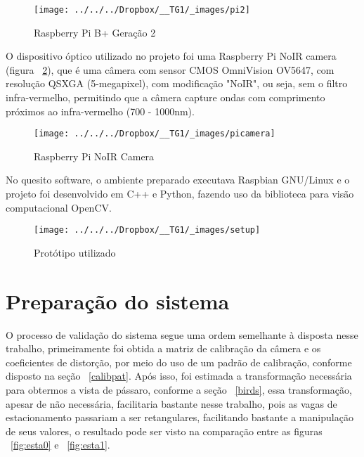 \documentclass[ecp,tc]{iiufrgs}
\begin{document}
\begin{figure}
	\centering
	\caption{Raspberry Pi B+ Geração 2}
	\texttt{[image: ../../../Dropbox/\_\_TG1/\_images/pi2]}
	\label{fig:rpi}
\end{figure}


O dispositivo óptico utilizado no projeto foi uma Raspberry Pi NoIR camera (figura ~\ref{fig:picam}), que é uma câmera com sensor CMOS OmniVision OV5647, com resolução QSXGA (5-megapixel), com modificação "NoIR", ou seja, sem o filtro infra-vermelho, permitindo que a câmera capture ondas com comprimento próximos ao infra-vermelho (700 - 1000nm).

\begin{figure}
	\centering
	\caption{Raspberry Pi NoIR Camera}
	\texttt{[image: ../../../Dropbox/\_\_TG1/\_images/picamera]}
	\label{fig:picam}
\end{figure}

No quesito software, o ambiente preparado executava Raspbian GNU/Linux e o projeto foi desenvolvido em C++ e Python, fazendo uso da biblioteca para visão computacional OpenCV.

\begin{figure}
	\centering
	\caption{Protótipo utilizado}
	\texttt{[image: ../../../Dropbox/\_\_TG1/\_images/setup]}
	\label{fig:setup}
\end{figure}

\section{Preparação do sistema}

O processo de validação do sistema segue uma ordem semelhante à disposta nesse trabalho, primeiramente foi obtida a matriz de calibração da câmera e os coeficientes de distorção, por meio do uso de um padrão de calibração, conforme disposto na seção ~\ref{calibpat}. Após isso, foi estimada a transformação necessária para obtermos a vista de pássaro, conforme a seção ~\ref{birds}, essa transformação, apesar de não necessária, facilitaria bastante nesse trabalho, pois as vagas de estacionamento passariam a ser retangulares, facilitando bastante a manipulação de seus valores, o resultado pode ser visto na comparação entre as figuras ~\ref{fig:esta0} e ~\ref{fig:esta1}.
\end{document}

